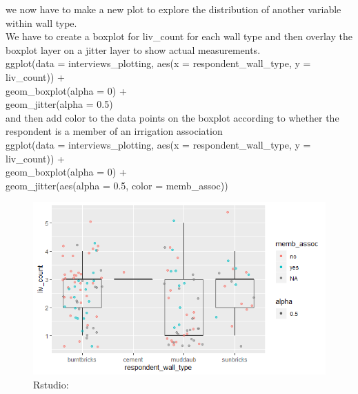 \documentclass{article}
\begin{document}
  we now have to make a new plot to explore the distribution of another variable within wall type.\\
  We have to create a boxplot for liv\_count for each wall type and then overlay the boxplot layer on a jitter layer to show actual measurements.\\
  ggplot(data = interviews\_plotting, aes(x = respondent\_wall\_type, y = liv\_count)) +\\
    geom\_boxplot(alpha = 0) +\\
    geom\_jitter(alpha = 0.5)\\
  and then add color to the data points on the boxplot according to whether the respondent is a member of an irrigation association\\
  ggplot(data = interviews\_plotting, aes(x = respondent\_wall\_type, y = liv\_count)) +\\
    geom\_boxplot(alpha = 0) +\\
    geom\_jitter(aes(alpha = 0.5, color = memb\_assoc))\\

\begin{figure}[H]
    \centering
    \includegraphics[width=\textwidth]{bloxplot 5.png}
    \caption{Rstudio:}
    \label{fig:bil12}  
\end{figure}
\end{document}
